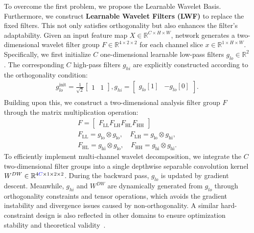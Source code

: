 \documentclass[a4paper,fleqn]{cas-dc}
\begin{document}
To overcome the first problem, we propose the Learnable Wavelet Basis. 
Furthermore, we construct \textbf{Learnable Wavelet Filters (LWF)} to replace the fixed filters.
This not only satisfies orthogonality but also enhances the filter's adaptability.
Given an input feature map $X \in \mathbb{R}^{C \times H \times W}$,
network {\color{blue}generates} a two-dimensional wavelet {\color{blue}filter} group $F \in \mathbb{R}^{4 \times 2 \times 2}$ for each channel slice $x \in \mathbb{R}^{1 \times H \times W}$.
Specifically, we first initialize $C$ one-dimensional learnable low-pass filters $g_{lo} \in \mathbb{R}^2 $.
The corresponding $C$ high-pass filters $g_{hi}$ are explicitly constructed according to the orthogonality condition:
\begin{equation}
\label{con:1d_filter}
\begin{aligned}
      g_{lo}^\text{init} = \frac{1}{\sqrt{2}}  \begin{bmatrix} 1 & 1 \end{bmatrix} , g_{hi} = \begin{bmatrix} g_{lo}[1] & -g_{lo}[0] \end{bmatrix}. \\
\end{aligned}
\end{equation}
Building upon this, we construct a two-dimensional analysis filter group $F$ through the matrix multiplication operation:
\begin{equation}
  \begin{split}
    F = \begin{bmatrix}F_{\text{LL}}  F_{\text{LH}} F_{\text{HL}} F_{\text{HH}} \end{bmatrix} \\
     F_{\text{LL}} = g_{\text{lo}} \otimes g_{\text{lo}}, \quad
     F_{\text{LH}} = g_{\text{lo}} \otimes g_{\text{hi}}, \\
     F_{\text{HL}} = g_{\text{hi}} \otimes g_{\text{lo}}, \quad
     F_{\text{HH}} = g_{\text{hi}} \otimes g_{\text{hi}}.
  \end{split}
\end{equation}
To efficiently implement multi-channel wavelet decomposition, 
we integrate the $C$ two-dimensional filter groups into a single depthwise separable convolution kernel $W^{DW} \in \mathbb{R}^{4{\color{blue}C} \times 1 \times 2 \times 2}$.
During the backward pass, $g_{lo}$ is updated by gradient descent. Meanwhile, $g_{hi}$ and $W^{DW}$ are dynamically generated from $g_{lo}$ through orthogonality constraints and tensor operations{, which avoids the gradient instability and divergence issues caused by non-orthogonality.} {A similar hard-constraint design is also reflected in other domains to ensure optimization stability and theoretical validity~\cite{jung2025vulnerability}.}
\end{document}
